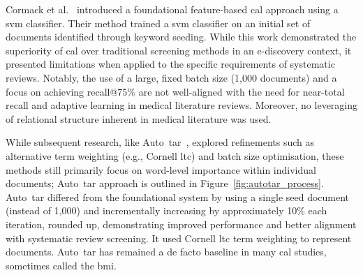 \documentclass[10pt,oneside]{book}
\begin{document}
Cormack et al.~\cite{cormack_evaluation_2014} introduced a foundational feature-based \gls*{cal} approach using a \gls*{svm} classifier. Their method trained a \gls*{svm} classifier on an initial set of documents identified through keyword seeding. While this work demonstrated the superiority of \gls*{cal} over traditional screening methods in an e-discovery context, it presented limitations when applied to the specific requirements of systematic reviews. Notably, the use of a large, fixed batch size (1,000 documents) and a focus on achieving recall@75\% are not well-aligned with the need for near-total recall and adaptive learning in medical literature reviews. Moreover, no leveraging of relational structure inherent in medical literature was used.

While subsequent research, like Auto~\gls*{tar}~\cite{cormack_autonomy_2015}, explored refinements such as alternative term weighting (e.g., Cornell ltc) and batch size optimisation, these methods still primarily focus on word-level importance within individual documents; Auto~\gls*{tar} approach is outlined in Figure~\ref{fig:autotar_process}. Auto~\gls*{tar} differed from the foundational system by using a single seed document (instead of 1,000) and incrementally increasing by approximately 10\% each iteration, rounded up, demonstrating improved performance and better alignment with systematic review screening. It used Cornell ltc term weighting \cite{salton_smart_1965} to represent documents. Auto~\gls*{tar} has remained a de facto baseline in many \gls*{cal} studies, sometimes called the \gls*{bmi}.
\end{document}
